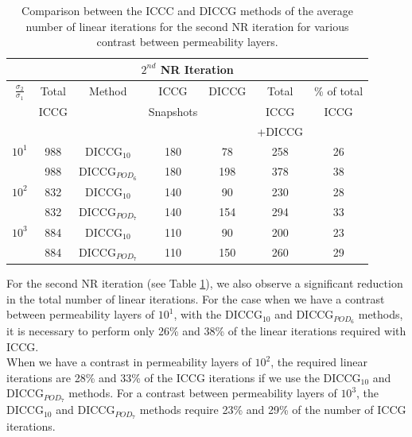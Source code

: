 \documentclass[review]{elsarticle}
\begin{document}
\begin{table}[!h]
\begin{minipage}{1\textwidth}
\vspace{-10pt}
\centering
\begin{tabular}{ ||c|c||c|c|c|c|c||} 

\hline
\multicolumn{7}{|c|}{$2^{nd}$ NR Iteration}  \\
\hline
$\frac{\sigma_2}{\sigma_1}$&Total&Method  & ICCG&DICCG &Total&\% of total\\
                           & ICCG     &  & Snapshots& &ICCG& ICCG\\
                           &     &  & & &+DICCG& \\
\hline
$10^{1}$ &988& DICCG$_{10}$&180&78&  258& 26\\
&988&DICCG$_{POD_6}$ &180&198&  378& 38\\
\hline
$10^{2}$&832&DICCG$_{10}$ &140&90&  230&28\\
&832&DICCG$_{POD_7}$&140&154&  294&33\\
\hline
$10^{3}$&884&DICCG$_{10}$&110&90&  200&23 \\
&884&DICCG$_{POD_7}$ &110&150&  260& 29\\
 \hline
 \end{tabular}
\caption{Comparison between the ICCC and DICCG methods of the average number of linear iterations for the second NR iteration for various contrast between permeability layers. }\label{table:litertot2}
\end{minipage}
\end{table}
For the second NR iteration (see Table \ref{table:litertot2}), we also observe a significant reduction in the total number of linear iterations.
For the case when we have a contrast between permeability layers of $10^{1}$, with the DICCG$_{10}$ and DICCG$_{POD_6}$ methods, it is necessary to perform only 26\% and 38\% of the linear iterations required with ICCG.\\
When we have a contrast in permeability layers of $10^{2}$, the required linear iterations are 28\% and 33\% of the ICCG iterations if we use the DICCG$_{10}$ and DICCG$_{POD_7}$ methods.
For a contrast between permeability layers of $10^{3}$, the DICCG$_{10}$ and DICCG$_{POD_7}$ methods require 23\%
and 29\% of the number of ICCG iterations. \\
\end{document}
